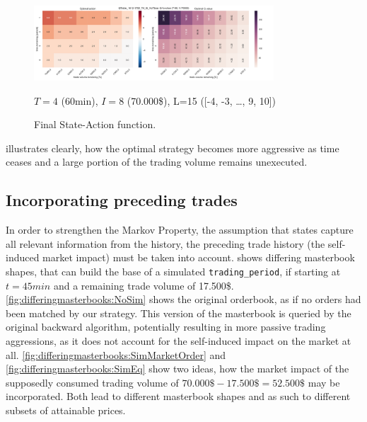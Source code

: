 \begin{figure}[ht]
	\centering
   \includegraphics[width=0.8\textwidth]{content/drawings/heatmap_3months}
	\caption{Final State-Action function.}
	$T=4$ (60min), $I=8$ (70.000\$), L=15 ([-4, -3, \ldots{}, 9, 10])
	\label{fig:heatmap}
\end{figure}

 illustrates clearly, how the optimal strategy becomes more aggressive as time ceases and a large portion of the trading volume remains unexecuted.\\

\subsection{Incorporating preceding trades}
\label{chap:backwardapproach:precedingTrades}
In order to strengthen the Markov Property, \ie the assumption that states capture all relevant information from the history, the preceding trade history  (\ie the self-induced market impact) must be taken into account.  shows differing masterbook shapes, that can build the base of a simulated \lstinline!trading_period!, \eg if starting at $t=45min$ and a remaining trade volume of 17.500\$. \ref{fig:differingmasterbooks:NoSim} shows the original orderbook, as if no orders had been matched by our strategy. This version of the masterbook is queried by the original backward algorithm, potentially resulting in more passive trading aggressions, as it does not account for the self-induced impact on the market at all. \ref{fig:differingmasterbooks:SimMarketOrder} and \ref{fig:differingmasterbooks:SimEq} show two ideas, how the market impact of the supposedly consumed trading volume of $70.000\$-17.500\$ = 52.500\$$ may be incorporated. Both lead to different masterbook shapes and as such to different subsets of attainable prices.\\

